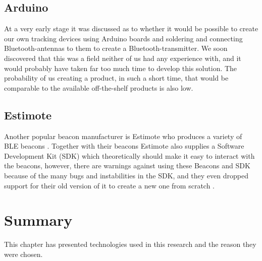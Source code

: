 \documentclass[../Main/thesis.tex]{subfiles}
\begin{document}
\subsection{Arduino}
At a very early stage it was discussed as to whether it would be possible to create our own tracking devices using Arduino boards and soldering and connecting Bluetooth-antennas to them to create a Bluetooth-transmitter.
We soon discovered that this was a field neither of us had any experience with, and it would probably have taken far too much time to develop this solution.
The probability of us creating a product, in such a short time, that would be comparable to the available off-the-shelf products is also low.

\subsection{Estimote}
Another popular beacon manufacturer is Estimote who produces a variety of BLE beacons \citep{EstimoteInc.2018}.
Together with their beacons Estimote also supplies a Software Development Kit (SDK) which theoretically should make it easy to interact with the beacons, however, there are warnings against using these Beacons and SDK because of the many bugs and instabilities in the SDK, and they even dropped support for their old version of it to create a new one from scratch \citep{Saetre2017}.


\section{Summary}
This chapter has presented technologies used in this research and the reason they were chosen.

\onlyinsubfile{}
\onlyinsubfile{}
\end{document}
